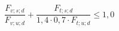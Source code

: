 \documentclass[12pt]{article}
\begin{document}
\begin{displaymath}
\frac {F_{v;s;d}} {F_{v;u;d}} + \frac {F_{t;s;d}} {1,4 \cdot 0,7 \cdot F_{t;u;d}} \leq 1,0
\end{displaymath}
\end{document}
